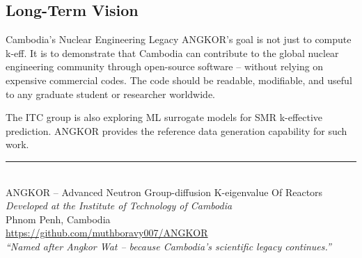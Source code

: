 \documentclass[12pt,a4paper]{article}
\begin{document}
\subsection{Long-Term Vision}

\begin{lessonbox}{Cambodia's Nuclear Engineering Legacy}
ANGKOR's goal is not just to compute k-eff. It is to demonstrate that
Cambodia can contribute to the global nuclear engineering community
through open-source software -- without relying on expensive commercial
codes. The code should be readable, modifiable, and useful to any
graduate student or researcher worldwide.

The ITC group is also exploring ML surrogate models for SMR k-effective
prediction. ANGKOR provides the reference data generation capability
for such work.
\end{lessonbox}

\vfill
\begin{center}
\rule{0.5\linewidth}{0.5pt}\\[0.5cm]
{\small ANGKOR -- Advanced Neutron Group-diffusion K-eigenvalue Of Reactors}\\
{\small\textit{Developed at the Institute of Technology of Cambodia}}\\
{\small Phnom Penh, Cambodia}\\
{\small \url{https://github.com/muthboravy007/ANGKOR}}\\[0.3cm]
{\small\itshape ``Named after Angkor Wat -- because Cambodia's scientific legacy continues.''}
\end{center}
\end{document}
